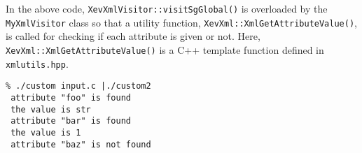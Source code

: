 In the above code, \texttt{XevXmlVisitor::visitSgGlobal()} is overloaded
by the \texttt{MyXmlVisitor} class so that a utility function,
\texttt{XevXml::XmlGetAttributeValue()}, is called for checking if each
attribute is given or not.  Here,
\texttt{XevXml::XmlGetAttributeValue()} is a C++ template function
defined in \texttt{xmlutils.hpp}.

\begin{verbatim}
% ./custom input.c |./custom2
 attribute "foo" is found
 the value is str
 attribute "bar" is found
 the value is 1
 attribute "baz" is not found
\end{verbatim}


